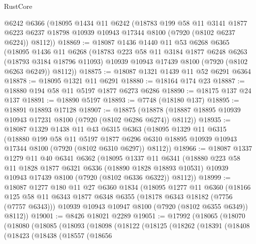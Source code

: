 \begin{lexlean}{RustCore}
\begin{coremodule}
    @6242
    @6366
    (@18095
      @1434
      @11
      @6242
      (@18783
        @199
        @58
        @11
        @3141
        @1877
        @6223
        @6237
        @18798
        @10939
        @10943
        @17344
        @8100
        (@7920 (@8102 @6237 @6224))
        @8112))
@18869 := @18087
    @1436
    @1440
    @11
    @53
    @6268
    @6365
    (@18095
      @1436
      @11
      @6268
      (@18783
        @223
        @58
        @11
        @3184
        @1877
        @6248
        @6263
        (@18793 @3184 @18796 @11093)
        @10939
        @10943
        @17439
        @8100
        (@7920 (@8102 @6263 @6249))
        @8112))
@18875 := @18087 @1321 @1439 @11 @52 @6291 @6364
@18878 := @18095 @1321 @11 @6291
@18880 := @18164 @174 @23
@18887 := @18880 @194 @58 @11 @5197 @1877 @6273 @6286
@18890 := @18175 @137 @24 @137
@18891 := @18890 @5197
@18893 := @7748 (@18180 @137)
@18895 := @18891 @18893 @17128
@18907 := @18875
    (@18878 (@18887 @18895 @10939 @10943 @17231 @8100 (@7920 (@8102 @6286 @6274)) @8112))
@18935 := @18087
    @1329
    @1438
    @11
    @43
    @6315
    @6363
    (@18095
      @1329
      @11
      @6315
      (@18880
        @199
        @58
        @11
        @5197
        @1877
        @6296
        @6310
        @18895
        @10939
        @10943
        @17344
        @8100
        (@7920 (@8102 @6310 @6297))
        @8112))
@18966 := @18087
    @1337
    @1279
    @11
    @40
    @6341
    @6362
    (@18095
      @1337
      @11
      @6341
      (@18880
        @223
        @58
        @11
        @1828
        @1877
        @6321
        @6336
        (@18890 @1828 @18893 @10531)
        @10939
        @10943
        @17439
        @8100
        (@7920 (@8102 @6336 @6322))
        @8112))
@18999 := @18087
    @1277
    @180
    @11
    @27
    @6360
    @1834
    (@18095
      @1277
      @11
      @6360
      (@18166
        @125
        @58
        @11
        @6343
        @1877
        @6348
        @6355
        (@18178 @6343 @18182 (@7756 (@7757 @6343)))
        @10939
        @10943
        @10947
        @8100
        (@7920 (@8102 @6355 @6349))
        @8112))
@19001 := @8426 @18021 @2289
@19051 := @17992
    (@18065
      (@18070
        (@18080
          (@18085
            (@18093
              (@18098
                (@18122
                  (@18125
                    (@18262
                      (@18391
                        (@18408
                          (@18423
                            (@18438
                              (@18557
                                (@18656

\end{coremodule}
\end{lexlean}

